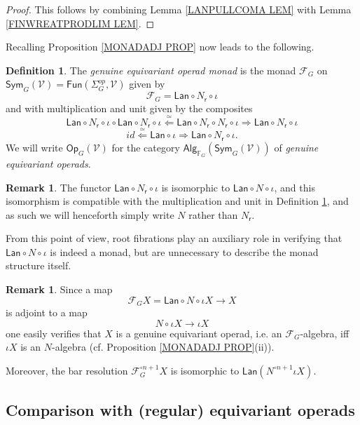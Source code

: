 \documentclass[a4paper,10pt
,draft
]{article}%
\numberwithin{equation}{section}
\numberwithin{figure}{section}
\theoremstyle{definition} %
\newtheorem{definition}[equation]{Definition}%
\newtheorem{remark}[equation]{Remark}%
\newcommand{\Op}{\mathsf{Op}}%
\newcommand{\F}{\ensuremath{\mathcal F}}
\newcommand{\V}{\ensuremath{\mathcal V}}
\newcommand{\1}{\ensuremath{\mathbbm 1}}%
\begin{document}
\begin{proof}
This follows by combining Lemma \ref{LANPULLCOMA LEM} with Lemma \ref{FINWREATPRODLIM LEM}.
\end{proof}

Recalling Proposition \ref{MONADADJ PROP} now leads to the following.
\begin{definition}\label{THEMONAD DEF}
The \textit{genuine equivariant operad monad} is the monad
$\F_G$ on $\mathsf{Sym}_G(\mathcal{V})=\mathsf{Fun}(\Sigma_G^{op}, \mathcal{V})$
given by
\[
	\F_G = \mathsf{Lan} \circ N_{\mathsf{r}} \circ \iota
\]
and with multiplication and unit given by the composites
\[
\mathsf{Lan} \circ N_{\mathsf{r}} \circ \iota \circ
\mathsf{Lan} \circ N_{\mathsf{r}} \circ \iota
\overset{\simeq}{\Leftarrow}
\mathsf{Lan} \circ N_{\mathsf{r}} \circ  N_{\mathsf{r}} \circ \iota
\Rightarrow
\mathsf{Lan} \circ N_{\mathsf{r}} \circ \iota
\]
\[
id \overset{\simeq}{\Leftarrow} \mathsf{Lan} \circ \iota
\Rightarrow
\mathsf{Lan} \circ N_{\mathsf{r}} \circ \iota.
\]
We will write $\Op_G(\V)$ for the category 
$\mathsf{Alg}_{\mathbb{F}_G}(\mathsf{Sym}_G(\mathcal{V}))$ of \textit{genuine equivariant operads}.
\end{definition}

\begin{remark}
	The functor $\mathsf{Lan} \circ N_{\mathsf{r}} \circ \iota$ is isomorphic to 
	$\mathsf{Lan} \circ N \circ \iota$, and this isomorphism is compatible with the multiplication and unit	in Definition \ref{THEMONAD DEF}, and as such we will henceforth simply write $N$ rather than $N_{\mathsf{r}}$.
	
	From this point of view, root fibrations play an auxiliary role in verifying that $\mathsf{Lan} \circ N \circ \iota$ is indeed a monad, but are unnecessary to describe the monad structure itself.
\end{remark}

\begin{remark}\label{REPACKAGERES REM}
Since a map 
\[\F_G X =\mathsf{Lan} \circ N \circ \iota X \to X\]
is adjoint to a map
\[N \circ \iota X \to \iota X \]
one easily verifies that 
$X$ is a genuine equivariant operad, i.e. 
an $\F_G$-algebra, iff 
$\iota X$ is an $N$-algebra
(cf. Proposition \ref{MONADADJ PROP}(ii)).

Moreover, the bar resolution
$ \F_G^{\circ n +1} X $
is isomorphic to
$
	\mathsf{Lan} \left( N^{\circ n +1} \iota X \right)
$.
\end{remark}

\subsection{Comparison with (regular) equivariant operads}
\label{COMPARISON_REGULAR_SECTION}
\end{document}
